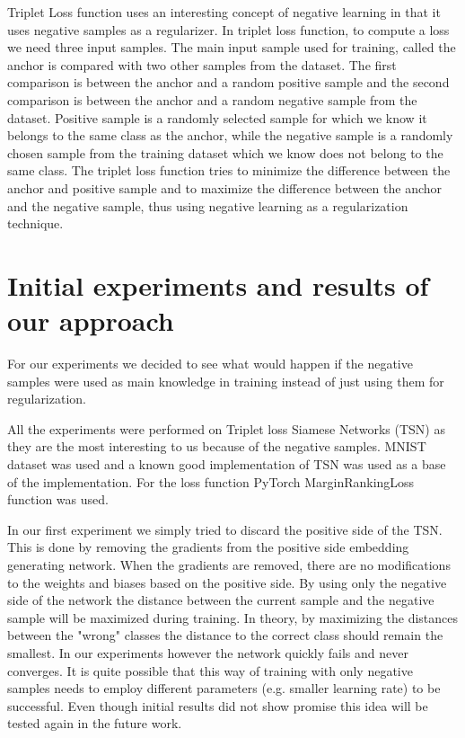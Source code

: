 \documentclass[b5paper]{book}
\begin{document}
Triplet Loss function uses an interesting concept of negative learning in that it uses negative samples as a regularizer. In triplet loss function, to compute a loss we need three input samples. The main input sample used for training, called the anchor is compared with two other samples from the dataset. The first comparison is between the anchor and a random positive sample and the second comparison is between the anchor and a random negative sample from the dataset. Positive sample is a randomly selected sample for which we know it belongs to the same class as the anchor, while the negative sample is a randomly chosen sample from the training dataset which we know does not belong to the same class. The triplet loss function tries to minimize the difference between the anchor and positive sample and to maximize the difference between the anchor and the negative sample, thus using negative learning as a regularization technique.

\section{Initial experiments and results of our approach}

For our experiments we decided to see what would happen if the negative samples were used as main knowledge in training instead of just using them for regularization. 

All the experiments were performed on Triplet loss Siamese Networks (TSN) as they are the most interesting to us because of the negative samples. MNIST dataset was used and a known good implementation of TSN was used as a base of the implementation. For the loss function PyTorch MarginRankingLoss function was used.

In our first experiment we simply tried to discard the positive side of the TSN. This is done by removing the gradients from the positive side embedding generating network. When the gradients are removed, there are no modifications to the weights and biases based on the positive side. By using only the negative side of the network the distance between the current sample and the negative sample will be maximized during training. In theory, by maximizing the distances between the "wrong" classes the distance to the correct class should remain the smallest. In our experiments however the network quickly fails and never converges. It is quite possible that this way of training with only negative samples needs to employ different parameters (e.g. smaller learning rate) to be successful. Even though initial results did not show promise this idea will be tested again in the future work.
\end{document}
